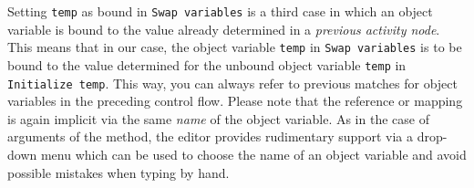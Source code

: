 Setting \texttt{temp} as bound in \texttt{Swap variables} is a third case in which an object variable is bound to the value already determined in a
\emph{previous activity node}. This means that in our case, the object variable \texttt{temp} in \texttt{Swap variables} is to be bound to the value determined
for the unbound object variable \texttt{temp} in \texttt{Initialize temp}. This way, you can always refer to previous matches for object variables in the
preceding control flow. Please note that the reference or mapping is again implicit via the same \emph{name} of the object variable.
As in the case of arguments of the method, the editor provides rudimentary support via a drop-down menu which can be used to choose the name of an object
variable and avoid possible mistakes when typing by hand.
